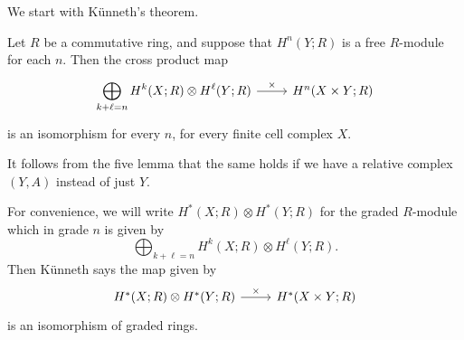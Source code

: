 \documentclass[a4paper]{article}
\begin{document}
We start with K\"unneth's theorem.
\begin{thm}
  Let $R$ be a commutative ring, and suppose that $H^n(Y; R)$ is a free $R$-module for each $n$. Then the cross product map
  \[
    \begin{tikzcd}
      \displaystyle\bigoplus_{k + \ell = n}H^k(X; R) \otimes H^\ell(Y; R) \ar[r, "\times"] & H^n(X \times Y; R)
    \end{tikzcd}
  \]
  is an isomorphism for every $n$, for every finite cell complex $X$.

  It follows from the five lemma that the same holds if we have a relative complex $(Y, A)$ instead of just $Y$.
\end{thm}
For convenience, we will write $H^*(X; R) \otimes H^*(Y; R)$ for the graded $R$-module which in grade $n$ is given by
\[
  \bigoplus_{k + \ell = n} H^k(X; R) \otimes H^\ell (Y; R).
\]
Then K\"unneth says the map given by
\[
  \begin{tikzcd}
    H^*(X; R) \otimes H^*(Y; R) \ar[r, "\times"] & H^*(X \times Y; R)
  \end{tikzcd}
\]
is an isomorphism of graded rings.
\end{document}
